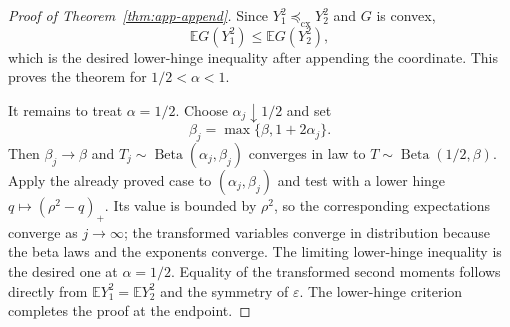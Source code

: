 \documentclass[10pt,a4paper]{amsart}
\newcommand{\E}{\mathbb{E}}
\newcommand{\cx}{\preceq_{\mathrm{cx}}}
\newcommand{\eps}{\varepsilon}
\begin{document}
\begin{proof}[Proof of Theorem~\ref{thm:app-append}]
Since $Y_1^2\cx Y_2^2$ and $G$ is convex,
\[
 \E G(Y_1^2)\le\E G(Y_2^2),
\]
which is the desired lower-hinge inequality after appending the coordinate.
This proves the theorem for $1/2<\alpha<1$.

It remains to treat $\alpha=1/2$. Choose $\alpha_j\downarrow1/2$ and
set
\[
 \beta_j=\max\{\beta,1+2\alpha_j\}.
\]
Then $\beta_j\to\beta$ and
$T_j\sim\operatorname{Beta}(\alpha_j,\beta_j)$ converges in law to
$T\sim\operatorname{Beta}(1/2,\beta)$. Apply the already proved case
to $(\alpha_j,\beta_j)$ and test with a lower hinge
$q\mapsto(\rho^2-q)_+$. Its value is bounded by $\rho^2$, so the
corresponding expectations converge as $j\to\infty$; the transformed
variables converge in distribution because the beta laws and the
exponents converge. The limiting lower-hinge inequality is the desired
one at $\alpha=1/2$. Equality of the transformed second moments follows
directly from $\E Y_1^2=\E Y_2^2$ and the symmetry of $\eps$. The
lower-hinge criterion completes the proof at the endpoint.
\end{proof}
\end{document}
